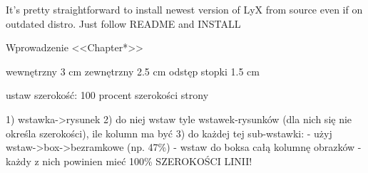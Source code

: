 
%
It's pretty straightforward to install newest version of LyX from source even if on outdated distro. Just follow 
README and INSTALL



Wprowadzenie <<Chapter*>> %













wewnętrzny    3 cm
zewnętrzny    2.5 cm
odstęp stopki 1.5 cm

ustaw szerokość: 100 procent szerokości strony


1) wstawka->rysunek
2) do niej wstaw tyle wstawek-rysunków (dla nich się nie określa szerokości), ile kolumn ma być
3) do każdej tej sub-wstawki:
- użyj wstaw->box->bezramkowe (np. 47\%)
- wstaw do boksa całą kolumnę obrazków - każdy z nich powinien mieć 100\% SZEROKOŚCI LINII!


